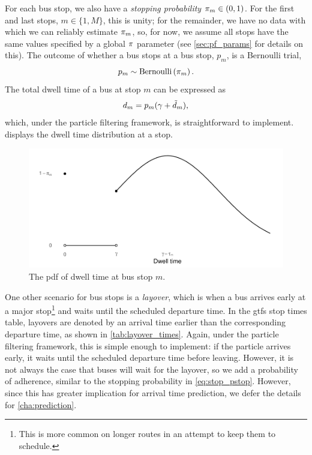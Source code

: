 For each bus stop, we also have a \emph{stopping probability} $\pi_m\in(0,1)$. For the first and last stops, $m\in\{1,M\}$, this is unity; for the remainder, we have no data with which we can reliably estimate $\pi_m$, so, for now, we assume all stops have the same values specified by a global $\pi$ parameter (see \cref{sec:pf_params} for details on this). The outcome of whether a bus stops at a bus stop, $p_m$, is a Bernoulli trial,
\begin{equation}
\label{eq:stop_pstop}
p_m \sim \mathrm{Bernoulli}\left(\pi_m\right).
\end{equation}
The total dwell time of a bus at stop $m$ can be expressed as
\begin{equation}
\label{eq:stop_total_dwell_time}
d_m = p_m (\gamma + \tilde d_m),
\end{equation}
which, under the particle filtering framework, is straightforward to implement.  displays the dwell time distribution at a stop.


\begin{knitrout}\small
{}\color{fgcolor}\begin{figure}

{\centering \includegraphics[width=.8\textwidth]{figure/eta_dwell_times-1} 

}

\caption[The \gls{pdf} of dwell time at a stop]{The \gls{pdf} of dwell time at bus stop $m$.}\label{fig:eta_dwell_times}
\end{figure}


\end{knitrout}


One other scenario for bus stops is a \emph{layover}, which is when a bus arrives early at a major stop\footnote{This is more common on longer routes in an attempt to keep them to schedule.} and waits until the scheduled departure time. In the \gls{gtfs} stop times table, layovers are denoted by an arrival time earlier than the corresponding departure time, as shown in \cref{tab:layover_times}. Again, under the particle filtering framework, this is simple enough to implement: if the particle arrives early, it waits until the scheduled departure time before leaving. However, it is not always the case that buses will wait for the layover, so we add a probability of adherence, similar to the stopping probability in \cref{eq:stop_pstop}. However, since this has greater implication for arrival time prediction, we defer the details for \cref{cha:prediction}.

